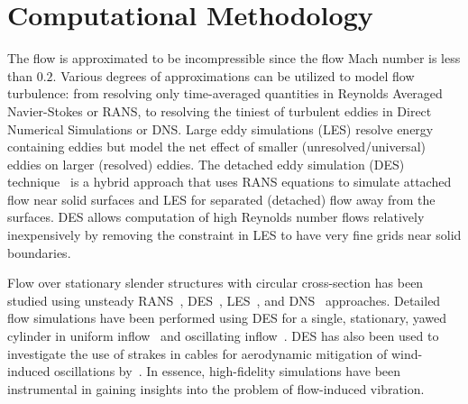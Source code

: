 \section{Computational Methodology}
\label{sec:methodology}
%
The flow is approximated to be incompressible since the flow Mach number is
less than $0.2$. Various degrees of approximations can be utilized to model
flow turbulence: from resolving only time-averaged quantities in Reynolds
Averaged Navier-Stokes or RANS, to resolving the tiniest of turbulent eddies in
Direct Numerical Simulations or DNS. Large eddy simulations (LES) resolve
energy containing eddies but model the net effect of smaller
(unresolved/universal) eddies on larger (resolved) eddies. The detached eddy
simulation (DES) technique~\citep{spalart1997comments} is a hybrid approach
that uses RANS equations to simulate attached flow near solid surfaces and LES
for separated (detached) flow away from the surfaces. DES allows computation of
high Reynolds number flows relatively inexpensively by removing the constraint
in LES to have very fine grids near solid boundaries.

Flow over stationary slender structures with circular cross-section has been
studied using unsteady RANS~\citep{pontaza2009three},
DES~\citep{travin2000detached,yeo2011computational,yeo2012aerodynamic},
LES~\citep{breuer1998large,kravchenko2000numerical,catalano2003numerical}, and
DNS~\citep{dong2005dns,zhao2009direct} approaches. Detailed flow simulations
have been performed using DES for a single, stationary, yawed cylinder in
uniform inflow~\citep{yeo2007characteristics,yeo2008investigation} and
oscillating inflow~\citep{yeo2012aerodynamic}.  DES has also been used to
investigate the use of strakes in cables for aerodynamic mitigation of
wind-induced oscillations by~\cite{yeo2011computational}. In essence,
high-fidelity simulations have been instrumental in gaining insights into the
problem of flow-induced vibration.

